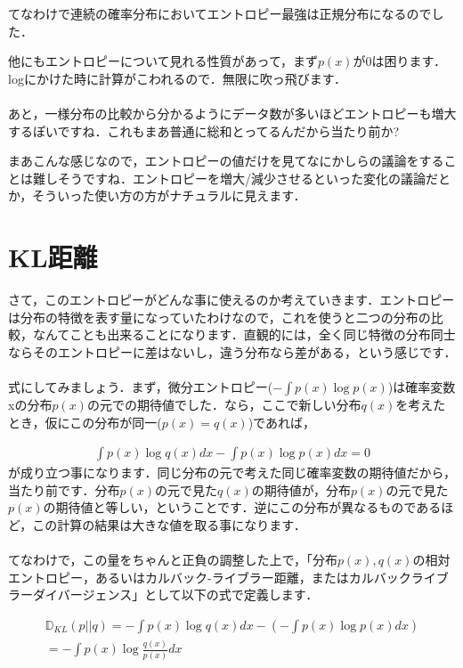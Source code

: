 \documentclass[11pt,a4paper]{ujreport}
\begin{document}
てなわけで連続の確率分布においてエントロピー最強は正規分布になるのでした．

他にもエントロピーについて見れる性質があって，まず$p(x)$が0は困ります．logにかけた時に計算がこわれるので．無限に吹っ飛びます．\\
\\

あと，一様分布の比較から分かるようにデータ数が多いほどエントロピーも増大するぽいですね．これもまあ普通に総和とってるんだから当たり前か?

まあこんな感じなので，エントロピーの値だけを見てなにかしらの議論をすることは難しそうですね．エントロピーを増大/減少させるといった変化の議論だとか，そういった使い方の方がナチュラルに見えます．

\section{KL距離}
さて，このエントロピーがどんな事に使えるのか考えていきます．エントロピーは分布の特徴を表す量になっていたわけなので，これを使うと二つの分布の比較，なんてことも出来ることになります．直観的には，全く同じ特徴の分布同士ならそのエントロピーに差はないし，違う分布なら差がある，という感じです．\\
\\

式にしてみましょう．まず，微分エントロピー($- \int p(x) \log p(x)$)は確率変数xの分布$p(x)$の元での期待値でした．なら，ここで新しい分布$q(x)$を考えたとき，仮にこの分布が同一($p(x) = q(x)$)であれば，

\begin{eqnarray}
\label{eq:KL1}
  \int p(x) \log q(x)dx - \int p(x) \log p(x)dx= 0
\end{eqnarray}
が成り立つ事になります．同じ分布の元で考えた同じ確率変数の期待値だから，当たり前です．分布$p(x)$の元で見た$q(x)$の期待値が，分布$p(x)$の元で見た$p(x)$の期待値と等しい，ということです．逆にこの分布が異なるものであるほど，この計算の結果は大きな値を取る事になります．\\
\\

てなわけで，この量をちゃんと正負の調整した上で，「分布$p(x), q(x)$の相対エントロピー，あるいはカルバック-ライブラー距離，またはカルバックライブラーダイバージェンス」として以下の式で定義します\cite{prml}．

\begin{eqnarray}
\label{eq:KLD}
  \mathbb{D}_{KL}(p||q) = - \int p(x) \log q(x)dx - (-\int p(x) \log p(x)dx)\\
  = -\int p(x) \log \frac{q(x)}{p(x)} dx
\end{eqnarray}
\end{document}
